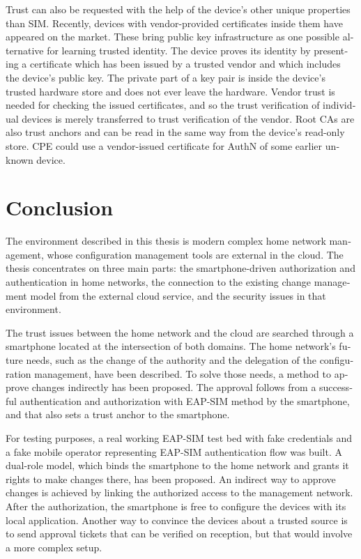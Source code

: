 \documentclass[12pt,a4paper,english]{tutthesis}
\begin{document}
\begin{otherlanguage}{english}
Trust can also be requested with the help of the device's other unique
properties than SIM. Recently, devices
with vendor-provided certificates inside them
have appeared on the market. These bring public key
infrastructure as one possible alternative for learning trusted
identity.  The device proves its identity by presenting a certificate
which has been issued by a trusted vendor and which includes the
device's public key. The private part of a key pair is inside the device's trusted
hardware store and does not ever leave the hardware. Vendor trust is
needed for checking the issued certificates, and so the trust
verification of individual devices is merely transferred to trust
verification of the vendor.  Root CAs are also trust anchors and can
be read in the same way from the device's read-only store.  CPE could
use a vendor-issued certificate for AuthN of some earlier unknown
device.

\chapter{Conclusion}
\label{sec-7}



The environment described in this thesis is modern complex home network
management, whose configuration management tools are external in the
cloud.  The thesis concentrates on three main parts:
the smartphone-driven authorization and authentication in home
networks, the connection to the existing change management model from
the external cloud service, and the security issues in that environment.

The trust issues between the home network and the cloud are searched
through a smartphone located at the intersection of both domains.
The home network's future needs, such as the change of the authority
and the delegation of the configuration management, have been
described.
To solve those needs, a method to approve changes indirectly has been
proposed. The approval follows from a successful authentication and
authorization with EAP-SIM method by the smartphone, and that also sets
a trust anchor to the smartphone.


For testing purposes, a real working EAP-SIM test bed with fake credentials and
a fake mobile operator representing EAP-SIM authentication flow was
built. A dual-role model, which binds the smartphone to the home network and
grants it rights to make changes there, has been proposed.  
An indirect way to approve changes is achieved by linking the authorized
access to the management network. After the authorization, the 
smartphone is free to configure the devices with its local application.
Another way to convince the
devices about a trusted source is to send approval tickets that can
be verified on reception, but that would involve a more complex setup.


\end{otherlanguage}
\end{document}
